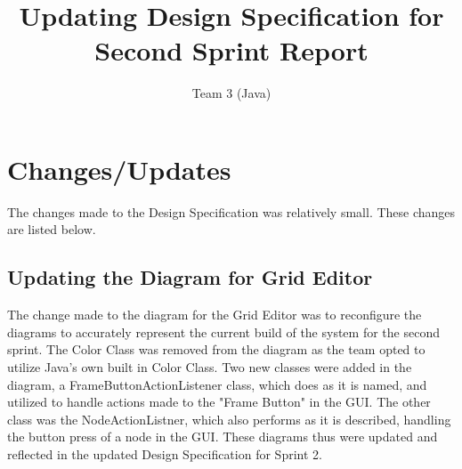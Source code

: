 \documentclass[12pt]{article}
\begin{document}
	
	\setlength{\parindent}{15pt}
	\newcommand{\forceindent}{\leavevmode{\parindent=2em\indent}}
	
	
	\title{Updating Design Specification for Second Sprint Report}
	\author{Team 3 (Java)}
	\date{}
	\maketitle
	
	\tableofcontents
	\setcounter{tocdepth}{3}		%
	\newpage
	
	\appendix
	
		\section{Changes/Updates}
		\forceindent The changes made to the Design Specification was relatively small. These changes are listed below.
		
			\subsection {Updating the Diagram for Grid Editor}
			\forceindent The change made to the diagram for the Grid Editor was to reconfigure the diagrams to accurately represent the current build of the system for the second sprint. The Color Class was removed from the diagram as the team opted to utilize Java's own built in Color Class. Two new classes were added in the diagram, a FrameButtonActionListener class, which does as it is named, and utilized to handle actions made to the "Frame Button" in the GUI. The other class was the NodeActionListner, which also performs as it is described, handling the button press of a node in the GUI. These diagrams thus were updated and reflected in the updated Design Specification for Sprint 2.
			
\end{document}

